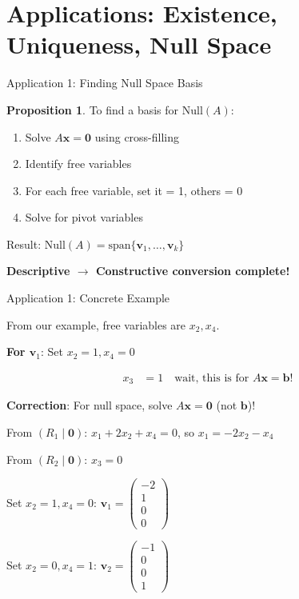 \documentclass[10pt]{beamer}
\theoremstyle{definition}
\newtheorem{prop}{Proposition}[section]
\newcommand{\x}[1]{\alert{\textbf{#1}}}
\begin{document}
\section{Applications: Existence, Uniqueness, Null Space}

\begin{frame}{Application 1: Finding Null Space Basis}

\begin{prop}
To find a basis for $\text{Null}(A)$:

\begin{enumerate}
\item Solve $A\mathbf{x} = \mathbf{0}$ using cross-filling
\item Identify free variables
\item For each free variable, set it = 1, others = 0
\item Solve for pivot variables
\end{enumerate}

Result: $\text{Null}(A) = \text{span}\{\mathbf{v}_1, \ldots, \mathbf{v}_k\}$

\x{Descriptive $\to$ Constructive conversion complete!}
\end{prop}

\end{frame}

\begin{frame}{Application 1: Concrete Example}

From our example, free variables are $x_2, x_4$.

\vspace{1em}

\x{For $\mathbf{v}_1$}: Set $x_2 = 1, x_4 = 0$

\begin{align*}
x_3 &= 1 \quad \text{wait, this is for } A\mathbf{x} = \mathbf{b}\text{!}
\end{align*}

\x{Correction}: For null space, solve $A\mathbf{x} = \mathbf{0}$ (not $\mathbf{b}$)!

\vspace{0.5em}

From $(R_1 \mid \mathbf{0})$: $x_1 + 2x_2 + x_4 = 0$, so $x_1 = -2x_2 - x_4$

From $(R_2 \mid \mathbf{0})$: $x_3 = 0$

Set $x_2 = 1, x_4 = 0$: $\mathbf{v}_1 = \begin{pmatrix} -2 \\ 1 \\ 0 \\ 0 \end{pmatrix}$

Set $x_2 = 0, x_4 = 1$: $\mathbf{v}_2 = \begin{pmatrix} -1 \\ 0 \\ 0 \\ 1 \end{pmatrix}$

\end{frame}
\end{document}

